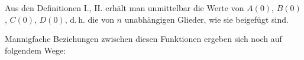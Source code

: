 Aus den Definitionen I., II. erhält man unmittelbar die Werte von
$A(0)$, $B(0)$, $C(0)$, $D(0)$, d.\,h. die von $n$ unabhängigen
Glieder, wie sie beigefügt sind.

Mannigfache Beziehungen zwischen diesen Funktionen ergeben sich noch
auf folgendem Wege:
